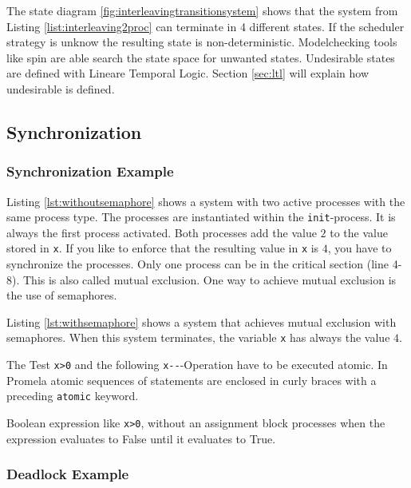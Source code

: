 \documentclass[a4paper, twoside]{article}
\begin{document}
The state diagram \ref{fig:interleavingtransitionsystem} shows that the system from Listing \ref{list:interleaving2proc} can terminate in 4 different states. If the scheduler strategy is unknow the resulting state is non-deterministic. Modelchecking tools like spin are able search the state space for unwanted states. Undesirable states are defined with Lineare Temporal Logic. Section \ref{sec:ltl} will explain how undesirable is defined.

\subsection{Synchronization}
\label{sec:synchronization}

\subsubsection{Synchronization Example}
\label{sec:syncexample}

Listing \ref{lst:withoutsemaphore} shows a system with two active processes with the same process type. The processes are instantiated within the \verb|init|-process. It is always the first process activated. Both processes add the value $2$ to the value stored in \verb|x|. If you like to enforce that the resulting value in \verb|x| is $4$, you have to synchronize the processes. Only one process can be in the critical section (line 4-8). This is also called mutual exclusion. One way to achieve mutual exclusion is the use of semaphores.

Listing \ref{lst:withsemaphore} shows a system that achieves mutual exclusion with semaphores. When this system terminates, the variable \verb|x| has always the value $4$.



The Test \verb|x>0| and the following \verb|x--|-Operation have to be executed atomic. In Promela atomic sequences of statements are enclosed in curly braces with a preceding \verb|atomic| keyword.

Boolean expression like \verb|x>0|, without an assignment block processes when the expression evaluates to False until it evaluates to True.



\subsubsection{Deadlock Example}
\label{sec:deadlock}
\end{document}

